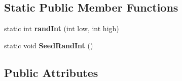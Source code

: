 \subsection*{Static Public Member Functions}
\begin{DoxyCompactItemize}
\item 
\mbox{\label{classgame_1_1GameDialog_ae7c1116be69edc81341379d98d3cd51d}} 
static int {\bfseries rand\+Int} (int low, int high)
\item 
\mbox{\label{classgame_1_1GameDialog_a5e7a526058daf99b2b03070d255ca142}} 
static void {\bfseries Seed\+Rand\+Int} ()
\end{DoxyCompactItemize}
\subsection*{Public Attributes}
